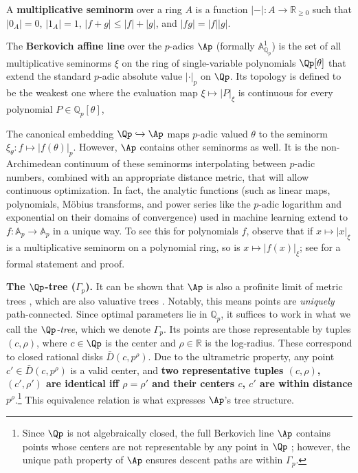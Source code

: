 \begin{definition}
    A \textbf{multiplicative seminorm} over a ring $A$ is a function $|-|: A \to \mathbb{R}_{\ge 0}$ such that $|0_A| = 0$, $|1_A| = 1$, $| f + g | \le |f| + |g|$, and $|fg| = |f||g|$.
\end{definition}

\begin{definition}
The \textbf{Berkovich affine line} over the $p$-adics $\Ap$ (formally $\mathbb{A}^1_{\mathbb{Q}_p}$) is the set of all multiplicative seminorms $\xi$ on the ring of single-variable polynomials $\Qp[\theta]$ that extend the standard $p$-adic absolute value $|\cdot|_p$ on $\Qp$. Its topology is defined to be the weakest one where the evaluation map $\xi \mapsto |P|_\xi$ is continuous for every polynomial $P \in \mathbb{Q}_p[\theta]$,
\end{definition}

The canonical embedding $\Qp \hookrightarrow \Ap$ maps $p$-adic valued $\theta$ to the seminorm $\xi_\theta: f \mapsto |f(\theta)|_p$.
However, $\Ap$ contains other seminorms as well. It is the non-Archimedean continuum of these seminorms interpolating between $p$-adic numbers, combined with an appropriate distance metric, that will allow continuous optimization. In fact, the analytic functions (such as linear maps, polynomials, Möbius transforms, and power series like the $p$-adic logarithm and exponential on their domains of convergence) used in machine learning extend to $f: \mathbb{A}_p \to \mathbb{A}_p$ in a unique way. To see this for polynomials $f$, observe that if $x \mapsto |x|_\xi$ is a multiplicative seminorm on a polynomial ring, so is $x \mapsto |f(x)|_\xi$; see  for a formal statement and proof.

\textbf{The $\Qp$-tree ($\Gamma_p$).} It can be shown that $\Ap$ is also a profinite limit of metric trees \citep{baker2010potential}, which are also valuative trees \citep{favre2004valuative}. Notably, this means points are \textit{uniquely} path-connected. Since optimal parameters lie in $\mathbb{Q}_p$, it suffices to work in what we call the \textit{$\Qp$-tree}, which we denote $\Gamma_p$. Its points are those representable by tuples $(c, \rho)$, where $c \in \Qp$ is the center and $\rho \in \mathbb{R}$ is the log-radius. These correspond to closed rational disks $\bar{D}(c, p^\rho)$. Due to the ultrametric property, any point $c' \in \bar{D}(c, p^\rho)$ is a valid center, and \textbf{two representative tuples $(c, \rho)$, $(c', \rho')$ are identical iff $\rho = \rho'$ and their centers $c$, $c'$ are within distance $p^\rho$}.\footnote{Since $\Qp$ is not algebraically closed, the full Berkovich line $\Ap$ contains points whose centers are not representable by any point in $\Qp$ \citep[\S I.6]{poineau2020berkovich}; however, the unique path property of $\Ap$ ensures descent paths are within $\Gamma_p$.} This equivalence relation is what expresses $\Ap$'s tree structure.

